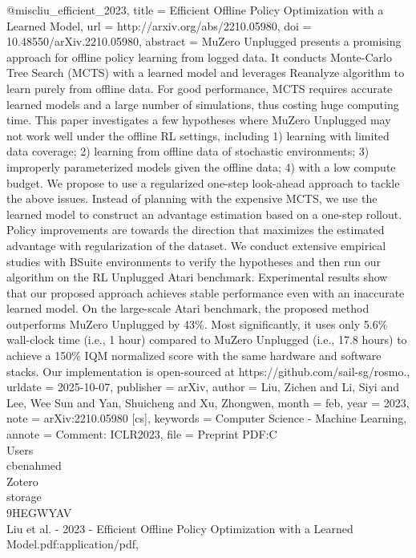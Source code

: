 @misc{liu_efficient_2023,
	title = {Efficient {Offline} {Policy} {Optimization} with a {Learned} {Model}},
	url = {http://arxiv.org/abs/2210.05980},
	doi = {10.48550/arXiv.2210.05980},
	abstract = {MuZero Unplugged presents a promising approach for offline policy learning from logged data. It conducts 
Monte-Carlo Tree Search (MCTS) with a learned model and leverages Reanalyze algorithm to learn purely from offline data. For 
good performance, MCTS requires accurate learned models and a large number of simulations, thus costing huge computing time. 
This paper investigates a few hypotheses where MuZero Unplugged may not work well under the offline RL settings, including 1) 
learning with limited data coverage; 2) learning from offline data of stochastic environments; 3) improperly parameterized 
models given the offline data; 4) with a low compute budget. We propose to use a regularized one-step look-ahead approach to 
tackle the above issues. Instead of planning with the expensive MCTS, we use the learned model to construct an advantage 
estimation based on a one-step rollout. Policy improvements are towards the direction that maximizes the estimated advantage 
with regularization of the dataset. We conduct extensive empirical studies with BSuite environments to verify the hypotheses and 
then run our algorithm on the RL Unplugged Atari benchmark. Experimental results show that our proposed approach achieves stable 
performance even with an inaccurate learned model. On the large-scale Atari benchmark, the proposed method outperforms MuZero 
Unplugged by 43\%. Most significantly, it uses only 5.6\% wall-clock time (i.e., 1 hour) compared to MuZero Unplugged (i.e., 
17.8 hours) to achieve a 150\% IQM normalized score with the same hardware and software stacks. Our implementation is 
open-sourced at https://github.com/sail-sg/rosmo.},
	urldate = {2025-10-07},
	publisher = {arXiv},
	author = {Liu, Zichen and Li, Siyi and Lee, Wee Sun and Yan, Shuicheng and Xu, Zhongwen},
	month = feb,
	year = {2023},
	note = {arXiv:2210.05980 [cs]},
	keywords = {Computer Science - Machine Learning},
	annote = {Comment: ICLR2023},
	file = {Preprint PDF:C\:\\Users\\cbenahmed\\Zotero\\storage\\9HEGWYAV\\Liu et al. - 2023 - Efficient Offline Policy 
Optimization with a Learned Model.pdf:application/pdf},
}

